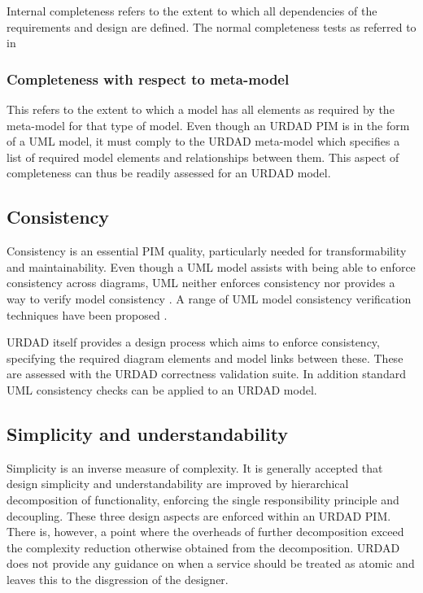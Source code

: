 Internal completeness refers to the extent to which all dependencies of the requirements and design are defined. The normal completeness tests as referred to in
\cite{lange_2004:anEmpiricalAssessmentOfCompletenessInUmlDesign} 


\subsubsection{Completeness with respect to meta-model}

This refers to the extent to which a model has all elements as required by the meta-model for that type of model. Even though an URDAD PIM is in the form of a UML model, it must comply to the URDAD meta-model which specifies a list of required model elements and relationships between them. This aspect of completeness can thus be readily assessed for an URDAD model.


\subsection{Consistency}

Consistency is an essential PIM quality,  particularly needed for transformability and maintainability.
Even though a UML model assists with being able to enforce consistency across diagrams, UML neither enforces consistency nor provides a way to verify model consistency \cite{usman_2008:surveyOfUmlConsistencyCheckingTechniques}. A range of UML model consistency verification techniques have been proposed \cite{usman_2008:surveyOfUmlConsistencyCheckingTechniques, shinkawa_2006:interModelConsistency}.

URDAD itself provides a design process which aims to enforce consistency, specifying the required diagram elements and model links between these. These are assessed with the URDAD correctness validation suite. In addition standard UML consistency checks can be applied to an URDAD model.


\subsection{Simplicity and understandability}

Simplicity is an inverse measure of complexity. It is generally accepted \cite{booch_2008:measuringArchitecturalComplexity,alsharif_2004:complexityOfSoftwareArchitectures} that design simplicity and understandability are improved by hierarchical decomposition of functionality, enforcing the single responsibility principle and decoupling. These three design aspects are enforced within an URDAD PIM. There is, however, a point where the overheads of further decomposition exceed the complexity reduction otherwise obtained from the decomposition\cite{alsharif_2004:complexityOfSoftwareArchitectures}. URDAD does not provide any guidance on when a service should be treated as atomic and leaves this to the disgression of the designer.

